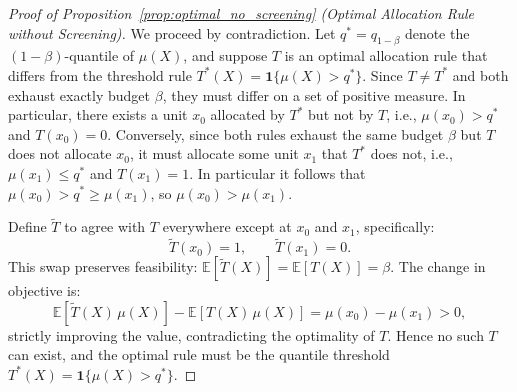 \begin{proof}[Proof of Proposition~\ref{prop:optimal_no_screening} (Optimal Allocation Rule without Screening)]
We proceed by contradiction. Let $q^* = q_{1-\beta}$ denote the $(1-\beta)$-quantile of $\mu(X)$, and suppose $T$ is an optimal allocation rule that differs from the threshold rule $T^*(X) = \mathbf{1}\{\mu(X) > q^*\}$. Since $T \neq T^*$ and both exhaust exactly budget $\beta$, they must differ on a set of positive measure. In particular, there exists a unit $x_0$ allocated by $T^*$ but not by $T$, i.e., $\mu(x_0) > q^*$ and $T(x_0) = 0$. Conversely, since both rules exhaust the same budget $\beta$ but $T$ does not allocate $x_0$, it must allocate some unit $x_1$ that $T^*$ does not, i.e., $\mu(x_1) \leq q^*$ and $T(x_1) = 1$. In particular it follows that $\mu(x_0) > q^* \geq \mu(x_1)$, so $\mu(x_0) > \mu(x_1)$.

Define $\tilde{T}$ to agree with $T$ everywhere except at $x_0$ and $x_1$, specifically:
$$\tilde{T}(x_0) = 1, \qquad \tilde{T}(x_1) = 0.$$
This swap preserves feasibility: $\mathbb{E}[\tilde{T}(X)] = \mathbb{E}[T(X)] = \beta$. The change in objective is:
$$\mathbb{E}[\tilde{T}(X)\,\mu(X)] - \mathbb{E}[T(X)\,\mu(X)] = \mu(x_0) - \mu(x_1) > 0,$$
strictly improving the value, contradicting the optimality of $T$. Hence no such $T$ can exist, and the optimal rule must be the quantile threshold $T^*(X) = \mathbf{1}\{\mu(X) > q^*\}$.
\end{proof}




